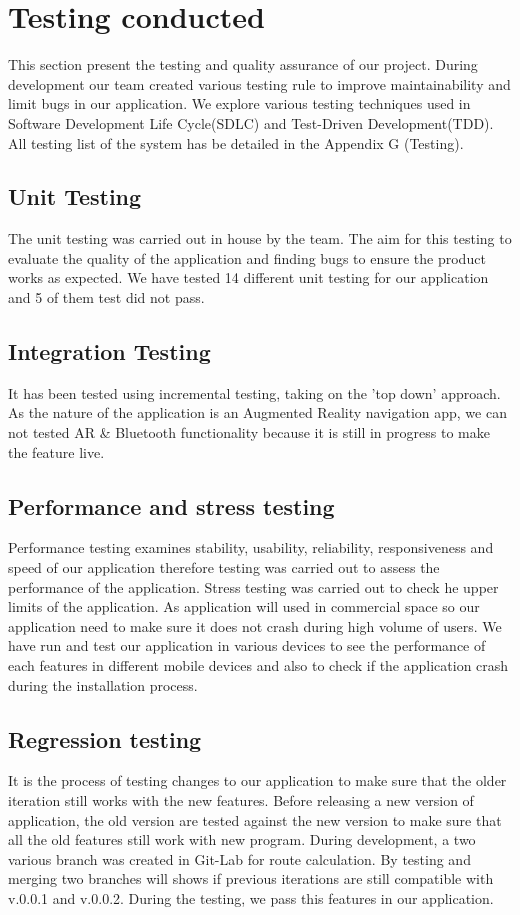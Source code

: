 \section{Testing conducted}
This section present the testing and quality assurance of our project. During development our team created various testing rule to improve maintainability and limit bugs in our application. We explore various testing techniques used in Software Development Life Cycle(SDLC) and Test-Driven Development(TDD). All testing list of the system has be detailed in the Appendix G (Testing).

\subsection{Unit Testing}
The unit testing was carried out in house by the team. The aim for this testing to evaluate the quality of the application and finding bugs to ensure the product works as expected. We have tested 14 different unit testing for our application and 5 of them test did not pass.

\subsection{Integration Testing}
It has been tested using incremental testing, taking on the 'top down' approach. As the nature of the application is an Augmented Reality navigation app, we can not tested AR \& Bluetooth functionality because it is still in progress to make the feature live.

\subsection{Performance and stress testing}
Performance testing examines stability, usability, reliability, responsiveness and speed of our application therefore testing was carried out to assess the performance of the application. Stress testing was carried out to check he upper limits of the application. As application will used in commercial space so our application need to make sure it does not crash during high volume of users. We have run and test our application in various devices to see the performance of each features in different mobile devices and also to check if the application crash during the installation process.

\subsection{Regression testing}
It is the process of testing changes to our application to make sure that the older iteration still works with the new features. Before releasing a new version of application, the old version are tested against the new version to make sure that all the old features still work with new program. During development, a two various branch was created in Git-Lab for route calculation. By testing and merging two branches will shows if previous iterations are still compatible with v.0.0.1 and v.0.0.2. During the testing, we pass this features in our application.

